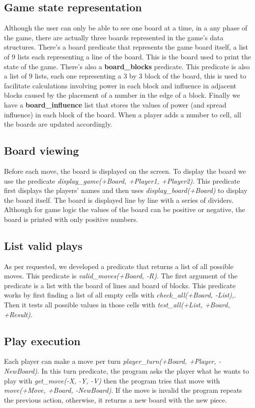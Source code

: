 \documentclass[a4paper]{article}
\begin{document}
\subsection{Game state representation} 
Although the user can only be able to see one board at a time, in a any phase of the game, there are actually three
boards represented in the game’s data structures. There’s a board predicate that represents the game board itself, a
list of 9 lists each representing a line of the board. This is the board used to print the state of the game. There’s 
also a \textbf{board\_blocks} predicate. This predicate is also a list of 9 lists, each one representing a 3 by 3 block of the 
board, this is used to facilitate calculations involving power in each block and influence in adjacent blocks caused 
by the placement of a number in the edge of a block. Finally we have a \textbf{board\_influence} list that stores the values of 
power (and spread influence) in each block of the board.  When a player adds a number to cell, all the boards are 
updated accordingly.


\subsection{Board viewing} 
Before each move, the board is displayed on the screen. To display the board we use the predicate \textit{display\_game(+Board, +Player1, +Player2)}. This predicate first displays the players' names and then uses \textit{display\_board(+Board)} to display the board itself. 
The board is displayed line by line with a series of dividers. Although for game logic the values of the board can be positive or negative, the board is printed with only positive numbers.

\subsection{List valid plays} 
As per requested, we developed a predicate that returns a list of all possible moves. This predicate is \textit{valid\_moves(+Board, -R)}. The first argument of the predicate is a list with the board of lines and board of blocks.
This predicate works by first finding a list of all empty cells with \textit{check\_all(+Board, -List),}. Then it tests all possible values in those cells with \textit{test_all(+List, +Board, +Result)}.

\subsection{Play execution} 
Each player can make a move per turn \textit{player\_turn(+Board, +Player, -NewBoard)}. In this turn predicate, the program asks the player what he wants to play with \textit{get_move(-X, -Y, -V)} then the program tries that move with \textit{move(+Move, +Board, -NewBoard)}.
If the move is invalid the program repeats the previous action, otherwise, it returns a new board with the new piece.
\end{document}

